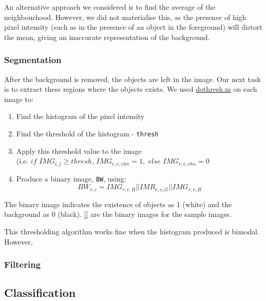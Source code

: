 \documentclass[main.tex]{subfiles}
\begin{document}
An alternative approach we considered is to find the average of the neighbourhood. However, we did not materialise this, as the presence of high pixel intensity (such as in the presence of an object in the foreground) will distort the mean, giving an inaccurate representation of the background.


\subsubsection*{Segmentation}
After the background is removed, the objects are left in the image. Our next task is to extract these regions where the objects exists. We used \hyperlink{dothresh}{dothresh.m} on each image to:
\begin{enumerate}
  \item Find the histogram of the pixel intensity
  \item Find the threshold of the histogram - \texttt{thresh}
  \item Apply this threshold value to the image\\(i.e. $if$ $IMG_{i,j} \ge thresh$, $IMG_{r,c,chn} = 1,$ $else$ $ IMG_{r,c,chn} = 0$
  \item Produce a binary image, \texttt{BW}, using:$$BW_{r,c} = IMG_{r,c,R} || IMR_{r,c,G} || IMG_{r,c,B}$$
\end{enumerate}

The binary image indicates the existence of objects as 1 (white) and the background as 0 (black). \autoref{} are the binary images for the sample images.


This thresholding algorithm works fine when the histogram produced is bimodal. However,
\subsubsection*{Filtering}


\subsection{Classification}
\end{document}
